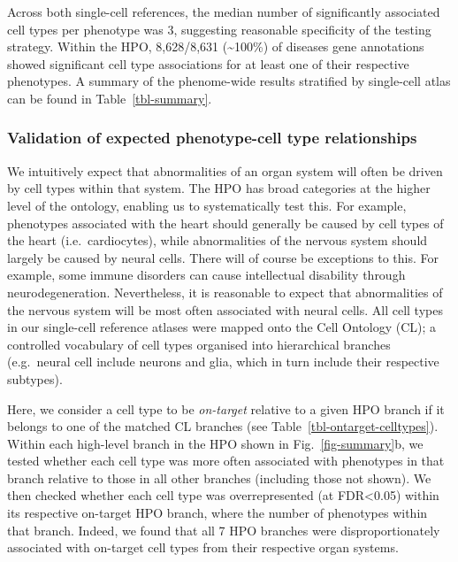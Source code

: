 \documentclass[
]{article}
\begin{document}
Across both single-cell references, the median number of significantly
associated cell types per phenotype was 3, suggesting reasonable
specificity of the testing strategy. Within the HPO, 8,628/8,631
(\textasciitilde100\%) of diseases gene annotations showed significant
cell type associations for at least one of their respective phenotypes.
A summary of the phenome-wide results stratified by single-cell atlas
can be found in Table~\ref{tbl-summary}.

\subsubsection{Validation of expected phenotype-cell type
relationships}\label{validation-of-expected-phenotype-cell-type-relationships}

We intuitively expect that abnormalities of an organ system will often
be driven by cell types within that system. The HPO has broad categories
at the higher level of the ontology, enabling us to systematically test
this. For example, phenotypes associated with the heart should generally
be caused by cell types of the heart (i.e.~cardiocytes), while
abnormalities of the nervous system should largely be caused by neural
cells. There will of course be exceptions to this. For example, some
immune disorders can cause intellectual disability through
neurodegeneration. Nevertheless, it is reasonable to expect that
abnormalities of the nervous system will be most often associated with
neural cells. All cell types in our single-cell reference atlases were
mapped onto the Cell Ontology (CL); a controlled vocabulary of cell
types organised into hierarchical branches (e.g.~neural cell include
neurons and glia, which in turn include their respective subtypes).

Here, we consider a cell type to be \emph{on-target} relative to a given
HPO branch if it belongs to one of the matched CL branches (see
Table~\ref{tbl-ontarget-celltypes}). Within each high-level branch in
the HPO shown in Fig.~\ref{fig-summary}b, we tested whether each cell
type was more often associated with phenotypes in that branch relative
to those in all other branches (including those not shown). We then
checked whether each cell type was overrepresented (at FDR\textless0.05)
within its respective on-target HPO branch, where the number of
phenotypes within that branch. Indeed, we found that all 7 HPO branches
were disproportionately associated with on-target cell types from their
respective organ systems.
\end{document}
